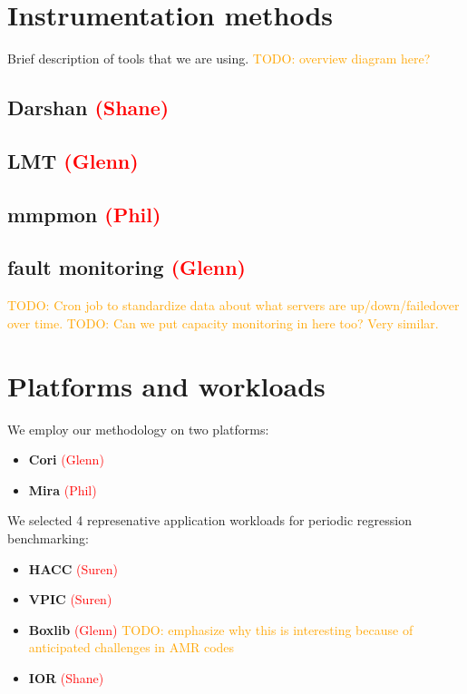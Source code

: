 \documentclass[conference,10pt,compsocconf]{IEEEtran}
\newcommand{\assign}[1]{\textcolor{red}{(#1)}}
\newcommand{\todo}[1]{\textcolor{Orange}{TODO: #1}}
\begin{document}
\section{Instrumentation methods}

Brief description of tools that we are using.
\todo{overview diagram here?}

\subsection{Darshan \assign{Shane}}

\subsection{LMT \assign{Glenn}}

\subsection{mmpmon \assign{Phil}}

\subsection{fault monitoring \assign{Glenn}}

\todo{Cron job to standardize data about what servers are up/down/failedover over
time.}
\todo{Can we put capacity monitoring in here too?  Very similar.}

\section{Platforms and workloads}

We employ our methodology on two platforms:

\begin{itemize}
\item \textbf{Cori} \assign{Glenn}
\item \textbf{Mira} \assign{Phil}
\end{itemize}

We selected 4 represenative application workloads for periodic regression
benchmarking:

\begin{itemize}
\item \textbf{HACC} \assign{Suren}
\item \textbf{VPIC} \assign{Suren}
\item \textbf{Boxlib} \assign{Glenn} \todo{emphasize why this is interesting
because of anticipated challenges in AMR codes}
\item \textbf{IOR} \assign{Shane}
\end{itemize}
\end{document}
